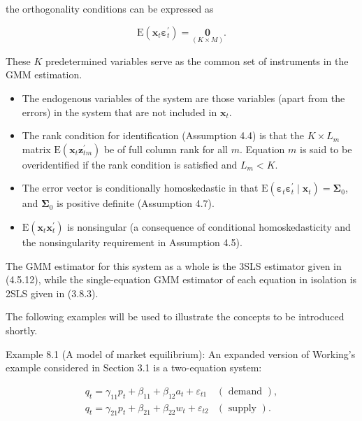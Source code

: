 \documentclass[10pt]{article}
\begin{document}
the orthogonality conditions can be expressed as


\begin{equation*}
\mathrm{E}\left(\mathbf{x}_{t} \boldsymbol{\varepsilon}_{t}^{\prime}\right)=\underset{(K \times M)}{\mathbf{0}} . \tag{8.5.3}
\end{equation*}


These $K$ predetermined variables serve as the common set of instruments in the GMM estimation.

\begin{itemize}
  \item The endogenous variables of the system are those variables (apart from the errors) in the system that are not included in $\mathbf{x}_{t}$.
  \item The rank condition for identification (Assumption 4.4) is that the $K \times L_{m}$ matrix $\mathrm{E}\left(\mathbf{x}_{t} \mathbf{z}_{t m}^{\prime}\right)$ be of full column rank for all $m$. Equation $m$ is said to be overidentified if the rank condition is satisfied and $L_{m}<K$.
  \item The error vector is conditionally homoskedastic in that $\mathrm{E}\left(\boldsymbol{\varepsilon}_{t} \boldsymbol{\varepsilon}_{t}^{\prime} \mid \mathbf{x}_{t}\right)=\boldsymbol{\Sigma}_{0}$, and $\boldsymbol{\Sigma}_{0}$ is positive definite (Assumption 4.7).
  \item $\mathrm{E}\left(\mathbf{x}_{t} \mathbf{x}_{t}^{\prime}\right)$ is nonsingular (a consequence of conditional homoskedasticity and the nonsingularity requirement in Assumption 4.5).
\end{itemize}

The GMM estimator for this system as a whole is the 3SLS estimator given in (4.5.12), while the single-equation GMM estimator of each equation in isolation is 2SLS given in (3.8.3).

The following examples will be used to illustrate the concepts to be introduced shortly.

Example 8.1 (A model of market equilibrium): An expanded version of Working's example considered in Section 3.1 is a two-equation system:

\[
\begin{array}{ll}
q_{t}=\gamma_{11} p_{t}+\beta_{11}+\beta_{12} a_{t}+\varepsilon_{t 1} & (\text { demand }), \\
q_{t}=\gamma_{21} p_{t}+\beta_{21}+\beta_{22} w_{t}+\varepsilon_{t 2} & (\text { supply }) . \tag{8.5.5}
\end{array}
\]
\end{document}
